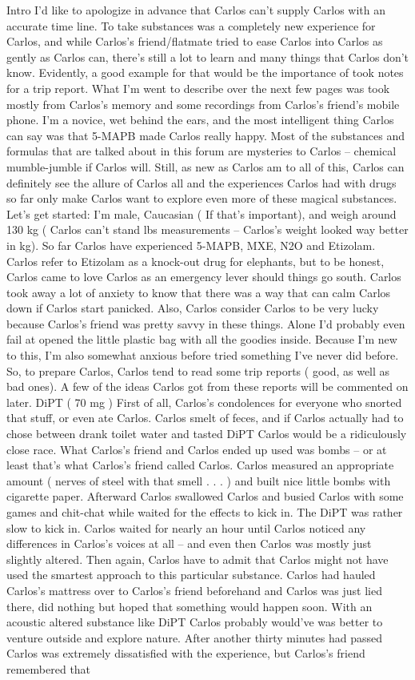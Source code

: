 \documentclass[12pt]{book}
\begin{document}
Intro I'd like to apologize in advance that Carlos can't supply Carlos with an accurate time line. To take substances was a completely new experience for Carlos, and while Carlos's friend/flatmate tried to ease Carlos into Carlos as gently as Carlos can, there's still a lot to learn and many things that Carlos don't know. Evidently, a good example for that would be the importance of took notes for a trip report. What I'm went to describe over the next few pages was took mostly from Carlos's memory and some recordings from Carlos's friend's mobile phone. I'm a novice, wet behind the ears, and the most intelligent thing Carlos can say was that 5-MAPB made Carlos really happy. Most of the substances and formulas that are talked about in this forum are mysteries to Carlos -- chemical mumble-jumble if Carlos will. Still, as new as Carlos am to all of this, Carlos can definitely see the allure of Carlos all and the experiences Carlos had with drugs so far only make Carlos want to explore even more of these magical substances. Let's get started: I'm male, Caucasian ( If that's important), and weigh around 130 kg ( Carlos can't stand lbs measurements -- Carlos's weight looked way better in kg). So far Carlos have experienced 5-MAPB, MXE, N2O and Etizolam. Carlos refer to Etizolam as a knock-out drug for elephants, but to be honest, Carlos came to love Carlos as an emergency lever should things go south. Carlos took away a lot of anxiety to know that there was a way that can calm Carlos down if Carlos start panicked. Also, Carlos consider Carlos to be very lucky because Carlos's friend was pretty savvy in these things. Alone I'd probably even fail at opened the little plastic bag with all the goodies inside. Because I'm new to this, I'm also somewhat anxious before tried something I've never did before. So, to prepare Carlos, Carlos tend to read some trip reports ( good, as well as bad ones). A few of the ideas Carlos got from these reports will be commented on later. DiPT ( 70 mg ) First of all, Carlos's condolences for everyone who snorted that stuff, or even ate Carlos. Carlos smelt of feces, and if Carlos actually had to chose between drank toilet water and tasted DiPT Carlos would be a ridiculously close race. What Carlos's friend and Carlos ended up used was bombs -- or at least that's what Carlos's friend called Carlos. Carlos measured an appropriate amount ( nerves of steel with that smell . . .   ) and built nice little bombs with cigarette paper. Afterward Carlos swallowed Carlos and busied Carlos with some games and chit-chat while waited for the effects to kick in. The DiPT was rather slow to kick in. Carlos waited for nearly an hour until Carlos noticed any differences in Carlos's voices at all -- and even then Carlos was mostly just slightly altered. Then again, Carlos have to admit that Carlos might not have used the smartest approach to this particular substance. Carlos had hauled Carlos's mattress over to Carlos's friend beforehand and Carlos was just lied there, did nothing but hoped that something would happen soon. With an acoustic altered substance like DiPT Carlos probably would've was better to venture outside and explore nature. After another thirty minutes had passed Carlos was extremely dissatisfied with the experience, but Carlos's friend remembered that 
\end{document}
